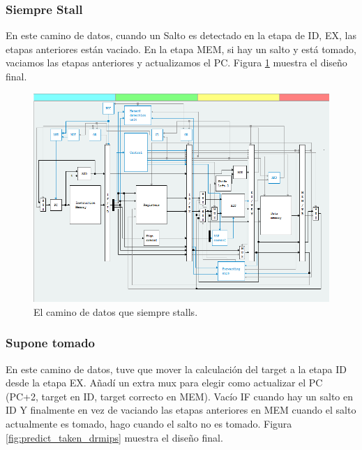 \documentclass[a4paper]{article}
\begin{document}
\subsubsection{Siempre Stall}

En este camino de datos, cuando un Salto es detectado en la etapa de ID, EX, las etapas anteriores están vaciado. En la etapa MEM, si hay un salto y está tomado, vaciamos las etapas anteriores y actualizamos el PC. Figura \ref{fig:always_stall_drmips} muestra el diseño final.

\begin{figure}[!htb]
\centering
\includegraphics[scale=0.4]{./img/always_stall_drmips}
\caption{El camino de datos que siempre stalls.}
\label{fig:always_stall_drmips}
\end{figure}

\subsubsection{Supone tomado}

En este camino de datos, tuve que mover la calculación del target a la etapa ID desde la etapa EX. Añadí un extra mux para elegir como actualizar el PC (PC+2, target en ID, target correcto en MEM). Vacío IF cuando hay un salto en ID Y finalmente en vez de vaciando las etapas anteriores en MEM cuando el salto actualmente es tomado, hago cuando el salto no es tomado. Figura \ref{fig:predict_taken_drmips} muestra el diseño final.
\end{document}
